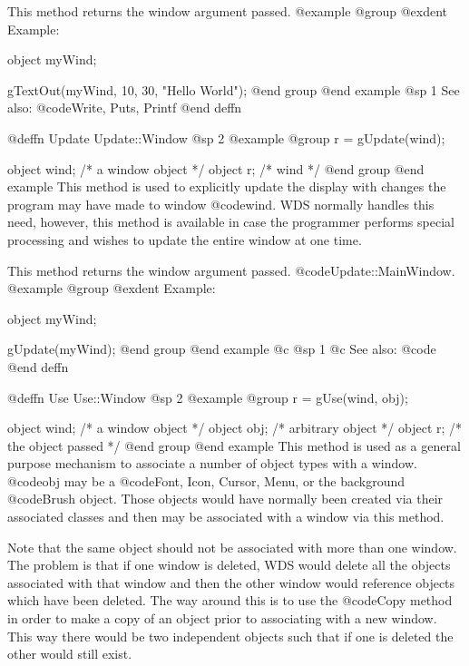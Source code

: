 This method returns the window argument passed.
@example
@group
@exdent Example:

object  myWind;

gTextOut(myWind, 10, 30, "Hello World");
@end group
@end example
@sp 1
See also:  @code{Write, Puts, Printf}
@end deffn









@deffn {Update} Update::Window
@sp 2
@example
@group
r = gUpdate(wind);

object  wind;   /*  a window object     */
object  r;      /*  wind                */
@end group
@end example
This method is used to explicitly update the display with changes the program
may have made to window @code{wind}.  WDS normally handles this need, however,
this method is available in case the programmer performs special processing
and wishes to update the entire window at one time.

This method returns the window argument passed.
@code{Update::MainWindow}.
@example
@group
@exdent Example:

object  myWind;

gUpdate(myWind);
@end group
@end example
@c @sp 1
@c See also:  @code{}
@end deffn









@deffn {Use} Use::Window
@sp 2
@example
@group
r = gUse(wind, obj);

object  wind;   /*  a window object     */
object  obj;    /*  arbitrary object    */
object  r;      /*  the object passed   */
@end group
@end example
This method is used as a general purpose mechanism to associate a
number of object types with a window.  @code{obj} may be a @code{Font,
Icon, Cursor, Menu,} or the background @code{Brush} object.  Those
objects would have normally been created via their associated classes
and then may be associated with a window via this method.

Note that the same object should not be associated with more than one
window.  The problem is that if one window is deleted, WDS would delete
all the objects associated with that window and then the other window
would reference objects which have been deleted.  The way around this is
to use the @code{Copy} method in order to make a copy of an object prior
to associating with a new window.  This way there would be two
independent objects such that if one is deleted the other would still
exist.

